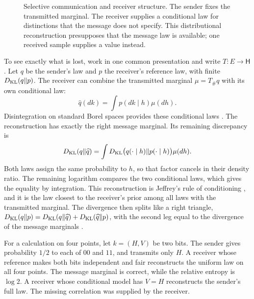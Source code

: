 \begin{figure}[htbp]
\centering

\caption{Selective communication and receiver structure. The sender fixes the transmitted marginal. The receiver supplies a conditional law for distinctions that the message does not specify. This distributional reconstruction presupposes that the message law is available; one received sample supplies a value instead.}
\label{fig:comp-message}
\end{figure}

To see exactly what is lost, work in one common presentation and write $T:E\to\mathsf H$. Let $q$ be the sender's law and $p$ the receiver's reference law, with finite $D_{\mathrm{KL}}(q\Vert p)$. The receiver can combine the transmitted marginal $\mu=T_\#q$ with its own conditional law:
\begin{equation}
\widehat q(dk)=\int p(dk\mid h)\mu(dh).
\label{comp:eq-reconstruction}
\end{equation}
Disintegration on standard Borel spaces provides these conditional laws \citep{Kallenberg2021}. The reconstruction has exactly the right message marginal. Its remaining discrepancy is
\begin{equation}
D_{\mathrm{KL}}(q\Vert\widehat q)
=\int D_{\mathrm{KL}}\bigl(q(\cdot\mid h)\Vert p(\cdot\mid h)\bigr)\mu(dh).
\label{comp:eq-reconstruction-discrepancy}
\end{equation}
Both laws assign the same probability to $h$, so that factor cancels in their density ratio. The remaining logarithm compares the two conditional laws, which gives the equality by integration. This reconstruction is Jeffrey's rule of conditioning \citep{DiaconisZabell1982}, and it is the law closest to the receiver's prior among all laws with the transmitted marginal. The divergence then splits like a right triangle, $D_{\mathrm{KL}}(q\Vert p)=D_{\mathrm{KL}}(q\Vert\widehat q)+D_{\mathrm{KL}}(\widehat q\Vert p)$, with the second leg equal to the divergence of the message marginals \citep{Csiszar1975}.

For a calculation on four points, let $k=(H,V)$ be two bits. The sender gives probability $1/2$ to each of $00$ and $11$, and transmits only $H$. A receiver whose reference makes both bits independent and fair reconstructs the uniform law on all four points. The message marginal is correct, while the relative entropy is $\log2$. A receiver whose conditional model has $V=H$ reconstructs the sender's full law. The missing correlation was supplied by the receiver.

